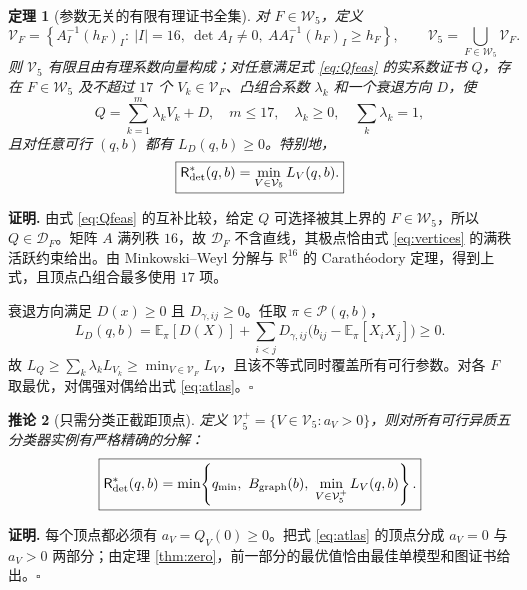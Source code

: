 \documentclass[11pt,a4paper]{ctexart}
\newtheorem{theorem}{定理}[section]
\newtheorem{corollary}[theorem]{推论}
\theoremstyle{definition}
\newenvironment{proofcn}{\par\noindent\textbf{证明.} }{\hfill$\square$\par}
\newcommand{\calP}{\mathcal P}
\newcommand{\calD}{\mathcal D}
\newcommand{\calV}{\mathcal V}
\newcommand{\Risk}{\mathsf R}
\begin{document}
\begin{theorem}[参数无关的有限有理证书全集]\label{thm:atlas}
对 $F\in\mathcal W_5$，定义
\begin{equation}\label{eq:vertices}
\calV_F=\left\{
 A_I^{-1}(h_F)_I:\ |I|=16,\ \det A_I\ne0,\ A A_I^{-1}(h_F)_I\ge h_F
\right\},
\qquad\calV_5=\bigcup_{F\in\mathcal W_5}\calV_F.
\end{equation}
则 $\calV_5$ 有限且由有理系数向量构成；对任意满足式 \eqref{eq:Qfeas} 的\emph{实系数}证书 $Q$，存在 $F\in\mathcal W_5$ 及不超过 $17$ 个 $V_k\in\calV_F$、凸组合系数 $\lambda_k$ 和一个衰退方向 $D$，使
\[
Q=\sum_{k=1}^m\lambda_kV_k+D,\quad
m\le17,\quad\lambda_k\ge0,\quad\sum_k\lambda_k=1,
\]
且对任意可行 $(q,b)$ 都有 $L_D(q,b)\ge0$。特别地，
\begin{equation}\label{eq:atlas}
\boxed{\Risk^*_{\rm det}(q,b)=\min_{V\in\calV_5}L_V(q,b).}
\end{equation}
\end{theorem}
\begin{proofcn}
由式 \eqref{eq:Qfeas} 的互补比较，给定 $Q$ 可选择被其上界的 $F\in\mathcal W_5$，所以 $Q\in\calD_F$。矩阵 $A$ 满列秩 $16$，故 $\calD_F$ 不含直线，其极点恰由式 \eqref{eq:vertices} 的满秩活跃约束给出。由 Minkowski--Weyl 分解与 $\mathbb R^{16}$ 的 Carath\'eodory 定理，得到上式，且顶点凸组合最多使用 $17$ 项。

衰退方向满足 $D(x)\ge0$ 且 $D_{\gamma,ij}\ge0$。任取 $\pi\in\calP(q,b)$，
\[
L_D(q,b)=\mathbb E_\pi[D(X)]+\sum_{i<j}D_{\gamma,ij}\bigl(b_{ij}-\mathbb E_\pi[X_iX_j]\bigr)\ge0.
\]
故 $L_Q\ge\sum_k\lambda_kL_{V_k}\ge\min_{V\in\calV_F}L_V$，且该不等式同时覆盖所有可行参数。对各 $F$ 取最优，对偶强对偶给出式 \eqref{eq:atlas}。\end{proofcn}

\begin{corollary}[只需分类正截距顶点]\label{cor:positive}
定义 $\calV_5^+=\{V\in\calV_5:a_V>0\}$，则对所有可行异质五分类器实例有\emph{严格精确}的分解：
\begin{equation}\label{eq:main}
\boxed{\displaystyle
\Risk^*_{\rm det}(q,b)=\min\!\left\{q_{\min},\ B_{\rm graph}(b),\ \min_{V\in\calV_5^+}L_V(q,b)\right\}.}
\end{equation}
\end{corollary}
\begin{proofcn}
每个顶点都必须有 $a_V=Q_V(0)\ge0$。把式 \eqref{eq:atlas} 的顶点分成 $a_V=0$ 与 $a_V>0$ 两部分；由定理 \ref{thm:zero}，前一部分的最优值恰由最佳单模型和图证书给出。\end{proofcn}
\end{document}
